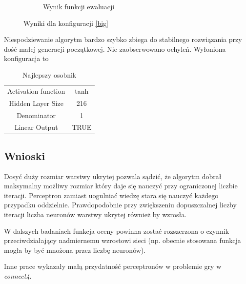 \documentclass{llncs}
\begin{document}
\begin{figure}[H]
\begin{subfigure}[b]{0.5\textwidth}
                \caption{Wynik funkcji ewaluacji}
                \label{fig:tiger}
        \end{subfigure}
        \caption{Wyniki dla konfiguracji \ref{big}}
        \label{fig:small}
\end{figure}

Niespodziewanie algorytm bardzo szybko zbiega do stabilnego rozwiązania przy dość małej
generacji początkowej. Nie zaobserwowano ochyleń. Wyłoniona konfiguracja to 
\begin{table}[H]
\caption{Najlepszy osobnik}
\label{the_choosen_one}
\centering
\begin{tabular}{|c|c|}
  Activation function                  & tanh \\
  Hidden Layer Size       & 216 \\ 
  Denominator & 1 \\
  Linear Output               & TRUE \\
\end{tabular} 
\end{table}

\subsection{Wnioski}
Dosyć duży rozmiar warstwy ukrytej pozwala sądzić, że algorytm dobrał
maksymalny możliwy rozmiar który daje się nauczyć przy ograniczonej liczbie 
iteracji. Perceptron zamiast uogulniać wiedzę stara się nauczyć każdego przypadku
oddzielnie. Prawdopodobnie przy zwiększeniu dopuszczalnej liczby iteracji
liczba neuronów warstwy ukrytej również by wzrosła.

W dalszych badaniach funkcja oceny powinna zostać rozszerzona o czynnik
przeciwdziałający nadmiernemu wzrostowi sieci (np. obecnie stosowana funkcja
mogła by być mnożona przez liczbę neuronów).

Inne prace wykazały małą przydatność perceptronów w problemie gry w \emph{connect4}.
\end{document}
